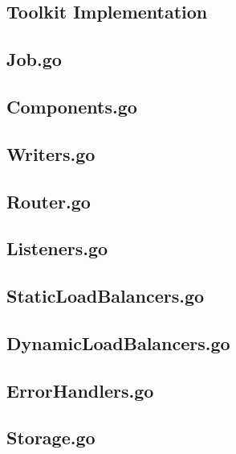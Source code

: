 \begin{appendices}
\newpage
\section{Toolkit Implementation}
\subsection{Job.go}


\subsection{Components.go}


\subsection{Writers.go}
\label{sec:writer.go}


\newpage
\subsection{Router.go}
\label{sec:Router.go}


\subsection{Listeners.go}
\label{sec:Listeners.go}


\subsection{StaticLoadBalancers.go}
\label{sec:StaticLoadBalancers.go}


\subsection{DynamicLoadBalancers.go}
\label{sec:DynamicLoadBalancers.go}


\subsection{ErrorHandlers.go}
\label{sec:ErrorHandlers.go}


\subsection{Storage.go}
\label{sec:Storage.go}



\end{appendices}
